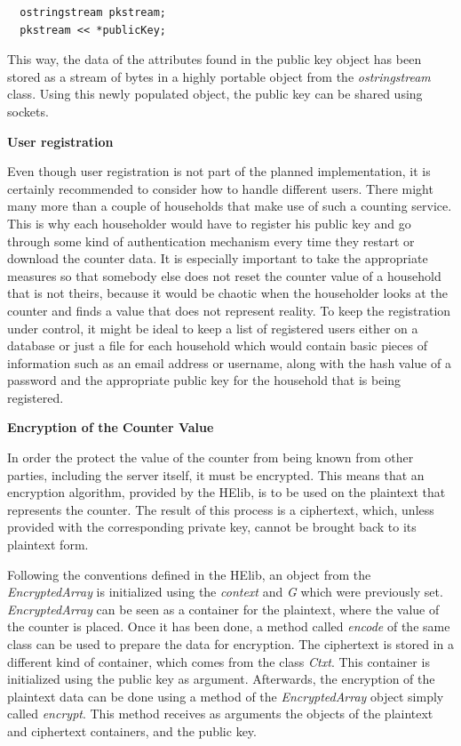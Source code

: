\begin{lstlisting}
  ostringstream pkstream;
  pkstream << *publicKey;
\end{lstlisting}


This way, the data of the attributes found in the public key object has been stored as a stream of bytes in a highly portable object from the \textit{ostringstream} class. Using this newly populated object, the public key can be shared using sockets.

\textbf{User registration}

Even though user registration is not part of the planned implementation, it is certainly recommended to consider how to handle different users. There might many more than a couple of households that make use of such a counting service. This is why each householder would have to register his public key and go through some kind of authentication mechanism every time they restart or download the counter data. It is especially important to take the appropriate measures so that somebody else does not reset the counter value of a household that is not theirs, because it would be chaotic when the householder looks at the counter and finds a value that does not represent reality.
To keep the registration under control, it might be ideal to keep a list of registered users either on a database or just a file for each household which would contain basic pieces of information such as an email address or username, along with the hash value of a password and the appropriate public key for the household that is being registered.


\textbf{Encryption of the Counter Value}

In order the protect the value of the counter from being known from other parties, including the server itself, it must be encrypted. This means that an encryption algorithm, provided by the HElib, is to be used on the plaintext that represents the counter. The result of this process is a ciphertext, which, unless provided with the corresponding private key, cannot be brought back to its plaintext form. 

Following the conventions defined in the HElib, an object from the \textit{EncryptedArray} is initialized using the \textit{context} and \textit{G} which were previously set. \textit{EncryptedArray} can be seen as a container for the plaintext, where the value of the counter is placed. Once it has been done, a method called \textit{encode} of the same class can be used to prepare the data for encryption. The ciphertext is stored in a different kind of container, which comes from the class \textit{Ctxt}. This container is initialized using the public key as argument. Afterwards, the encryption of the plaintext data can be done using a method of the \textit{EncryptedArray} object simply called \textit{encrypt}. This method receives as arguments the objects of the plaintext and ciphertext containers, and the public key.

